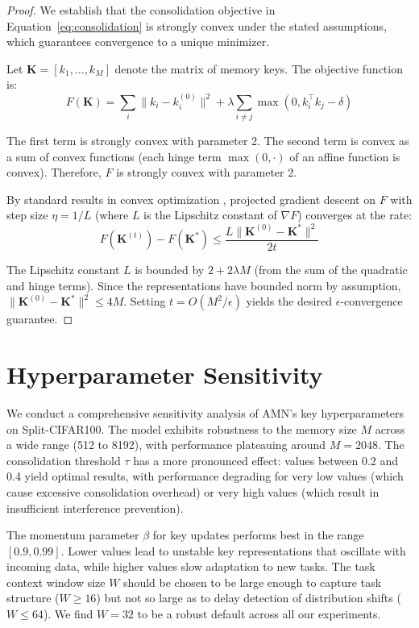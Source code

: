 \documentclass[11pt]{article}
\begin{document}
\begin{proof}
We establish that the consolidation objective in Equation~\ref{eq:consolidation} is strongly convex under the stated assumptions, which guarantees convergence to a unique minimizer.

Let $\mathbf{K} = [k_1, \ldots, k_M]$ denote the matrix of memory keys. The objective function is:
\begin{equation}
    F(\mathbf{K}) = \sum_{i} \|k_i - k_i^{(0)}\|^2 + \lambda \sum_{i \neq j} \max(0, k_i^\top k_j - \delta)
\end{equation}

The first term is strongly convex with parameter 2. The second term is convex as a sum of convex functions (each hinge term $\max(0, \cdot)$ of an affine function is convex). Therefore, $F$ is strongly convex with parameter 2.

By standard results in convex optimization \citep{boyd2004convex}, projected gradient descent on $F$ with step size $\eta = 1/L$ (where $L$ is the Lipschitz constant of $\nabla F$) converges at the rate:
\begin{equation}
    F(\mathbf{K}^{(t)}) - F(\mathbf{K}^*) \leq \frac{L \|\mathbf{K}^{(0)} - \mathbf{K}^*\|^2}{2t}
\end{equation}

The Lipschitz constant $L$ is bounded by $2 + 2\lambda M$ (from the sum of the quadratic and hinge terms). Since the representations have bounded norm by assumption, $\|\mathbf{K}^{(0)} - \mathbf{K}^*\|^2 \leq 4M$. Setting $t = O(M^2/\epsilon)$ yields the desired $\epsilon$-convergence guarantee.
\end{proof}

\section{Hyperparameter Sensitivity}
\label{app:hyperparams}

We conduct a comprehensive sensitivity analysis of AMN's key hyperparameters on Split-CIFAR100. The model exhibits robustness to the memory size $M$ across a wide range (512 to 8192), with performance plateauing around $M = 2048$. The consolidation threshold $\tau$ has a more pronounced effect: values between 0.2 and 0.4 yield optimal results, with performance degrading for very low values (which cause excessive consolidation overhead) or very high values (which result in insufficient interference prevention).

The momentum parameter $\beta$ for key updates performs best in the range $[0.9, 0.99]$. Lower values lead to unstable key representations that oscillate with incoming data, while higher values slow adaptation to new tasks. The task context window size $W$ should be chosen to be large enough to capture task structure ($W \geq 16$) but not so large as to delay detection of distribution shifts ($W \leq 64$). We find $W = 32$ to be a robust default across all our experiments.
\end{document}
